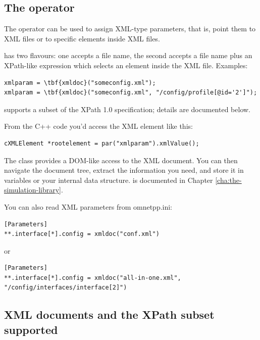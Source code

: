 \subsection{The  operator}

The  operator can be used to assign XML-type parameters,
that is, point them to XML files or to specific elements inside XML files.

 has two flavours: one accepts a file name, the second accepts
a file name plus an XPath-like expression which selects an element
inside the XML file. Examples:

\begin{Verbatim}[commandchars=\\\{\}]
xmlparam = \tbf{xmldoc}("someconfig.xml");
xmlparam = \tbf{xmldoc}("someconfig.xml", "/config/profile[@id='2']");
\end{Verbatim}

{\opp} supports a subset of the XPath 1.0 specification; details are
documented below.

From the C++ code you'd access the XML element like this:

\begin{verbatim}
cXMLElement *rootelement = par("xmlparam").xmlValue();
\end{verbatim}

The  class provides a DOM-like access to the XML document.
You can then navigate the document tree, extract the information you need,
and store it in variables or your internal data structure.
 is documented in Chapter \ref{cha:the-simulation-library}.

You can also read XML parameters from omnetpp.ini:

\begin{verbatim}
[Parameters]
**.interface[*].config = xmldoc("conf.xml")
\end{verbatim}

or

\begin{verbatim}
[Parameters]
**.interface[*].config = xmldoc("all-in-one.xml", "/config/interfaces/interface[2]")
\end{verbatim}


\subsection{XML documents and the XPath subset supported}

